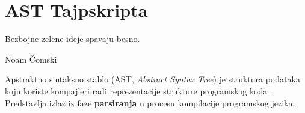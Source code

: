 \chapter{AST Tajpskripta}

\epigraph{
  Bezbojne zelene ideje spavaju besno.\footnotemark
}{Noam Čomski}


Apstraktno sintaksno stablo (AST, \textsl{Abstract Syntax Tree}) je struktura podataka koju koriste kompajleri radi reprezentacije strukture programskog koda \cite{wiki:ast}.
Predstavlja izlaz iz faze \textbf{parsiranja} u procesu kompilacije programskog jezika.



